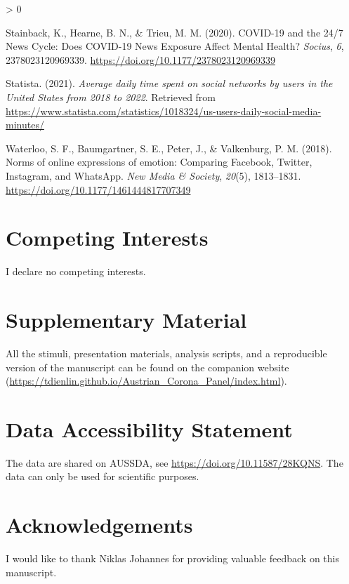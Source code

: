 \documentclass[
  english,
  man,floatsintext]{apa6}
\newlength{\cslhangindent}
\newenvironment{CSLReferences}[2] %
 {%
  \setlength{\parindent}{0pt}
  \ifodd #1 \everypar{\setlength{\hangindent}{\cslhangindent}}\ignorespaces\fi
  \ifnum #2 > 0
  \setlength{\parskip}{#2\baselineskip}
  \fi
 }%
 {}
\begin{document}
\begin{CSLReferences}{1}{0}
\leavevmode\hypertarget{ref-stainbackCOVID1924News2020}{}%
Stainback, K., Hearne, B. N., \& Trieu, M. M. (2020). {COVID}-19 and the 24/7 {News} {Cycle}: {Does} {COVID}-19 {News} {Exposure} {Affect} {Mental} {Health}? \emph{Socius}, \emph{6}, 2378023120969339. \url{https://doi.org/10.1177/2378023120969339}

\leavevmode\hypertarget{ref-statistaAverageDailyTime2021}{}%
Statista. (2021). \emph{Average daily time spent on social networks by users in the {United} {States} from 2018 to 2022}. Retrieved from \url{https://www.statista.com/statistics/1018324/us-users-daily-social-media-minutes/}

\leavevmode\hypertarget{ref-waterlooNormsOnlineExpressions2018}{}%
Waterloo, S. F., Baumgartner, S. E., Peter, J., \& Valkenburg, P. M. (2018). Norms of online expressions of emotion: {Comparing} {Facebook}, {Twitter}, {Instagram}, and {WhatsApp}. \emph{New Media \& Society}, \emph{20}(5), 1813--1831. \url{https://doi.org/10.1177/1461444817707349}

\end{CSLReferences}

\newpage

\hypertarget{competing-interests}{%
\section{Competing Interests}\label{competing-interests}}

I declare no competing interests.

\hypertarget{supplementary-material}{%
\section{Supplementary Material}\label{supplementary-material}}

All the stimuli, presentation materials, analysis scripts, and a reproducible version of the manuscript can be found on the companion website (\url{https://tdienlin.github.io/Austrian_Corona_Panel/index.html}).

\hypertarget{data-accessibility-statement}{%
\section{Data Accessibility Statement}\label{data-accessibility-statement}}

The data are shared on AUSSDA, see \url{https://doi.org/10.11587/28KQNS}.
The data can only be used for scientific purposes.

\hypertarget{acknowledgements}{%
\section{Acknowledgements}\label{acknowledgements}}

I would like to thank Niklas Johannes for providing valuable feedback on this manuscript.
\end{document}
